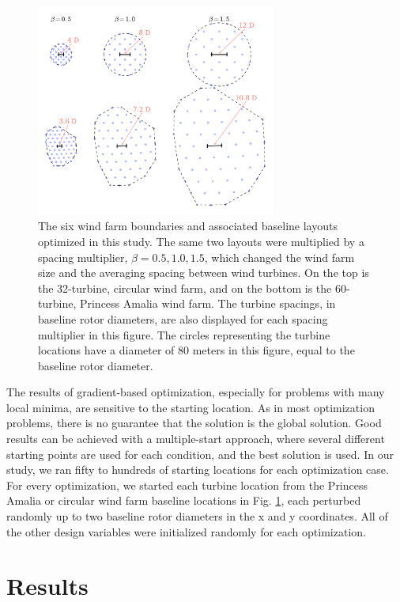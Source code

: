 \documentclass[WESD, manuscript]{copernicus}
\begin{document}
\begin{figure}[htbp]
  \centering
  \includegraphics[width=0.7\textwidth]{Figures/spacing_multipliers.pdf}
  \caption{\label{farm_spacings}The six wind farm boundaries and associated baseline layouts optimized in this study. The same two layouts were multiplied by a spacing multiplier, $\beta=0.5,1.0,1.5$, which changed the wind farm size and the averaging spacing between wind turbines.  On the top is the 32-turbine, circular wind farm, and on the bottom is the 60-turbine, Princess Amalia wind farm. The turbine spacings, in baseline rotor diameters, are also displayed for each spacing multiplier in this figure. The circles representing the turbine locations have a diameter of 80 meters in this figure, equal to the baseline rotor diameter.}
\end{figure}

The results of gradient-based optimization, especially for problems with many local minima, are sensitive to the starting location. As in most optimization problems, there is no guarantee that the solution is the global solution. Good results can be achieved with a multiple-start approach, where several different starting points are used for each condition, and the best solution is used. In our study, we ran fifty to hundreds of starting locations for each optimization case. For every optimization, we started each turbine location from the Princess Amalia or circular wind farm baseline locations in Fig. \ref{farm_spacings}, each perturbed randomly up to two baseline rotor diameters in the x and y coordinates. All of the other design variables were initialized randomly for each optimization.




\section{Results}
\newcommand\myeq{\mkern1.5mu{=}\mkern1.5mu}
\end{document}
